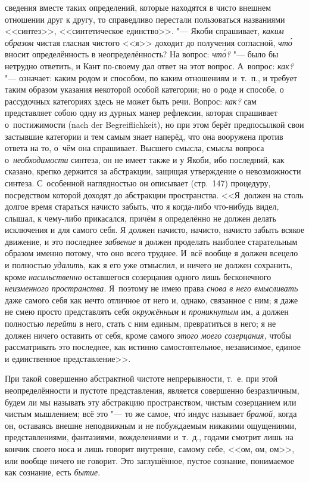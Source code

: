 сведения вместе таких определений, которые находятся в чисто внешнем отношении
друг к другу, то справедливо перестали пользоваться названиями <<синтез>>,
<<синтетическое единство>>. "--- Якоби спрашивает, {\em каким образом}
чистая гласная чистого <<я>> доходит до получения согласной, {\em чт\'{о}}
вносит определённость в неопределённость? На вопрос: {\em чт\'{о}?} "--- было бы
нетрудно ответить, и Кант по-своему дал ответ на этот вопрос. А~вопрос:
{\em как?} "--- означает: каким родом и способом, по каким отношениям и~т.~п.,
и требует таким образом указания некоторой особой категории; но о роде и
способе, о рассудочных категориях здесь не может быть речи. Вопрос: {\em как?}
сам представляет собою одну из дурных манер рефлексии, которая спрашивает
о~постижимости (nach der Begrei\-flich\-keit), но при этом берёт предпосылкой
свои застывшие категории и тем самым знает наперёд, что она вооружена против
ответа на то, о~чём она спрашивает. Высшего смысла, смысла вопроса
о~{\em необходимости} синтеза, он не имеет также и у Якоби, ибо последний, как
сказано, крепко держится за абстракции, защищая утверждение о невозможности
синтеза. С~особенной наглядностью он описывает (стр.~147) процедуру,
посредством которой доходят до абстракции пространства. <<Я~должен на столь
долгое время стараться начисто забыть, что я когда-либо что-нибудь видел,
слышал, к чему-либо прикасался, причём я определённо не должен делать
исключения и для самого себя. Я должен начисто, начисто, начисто забыть всякое
движение, и это последнее {\em забвение} я должен проделать наиболее
старательным образом именно потому, что оно всего труднее. И~всё вообще я
должен всецело и полностью {\em удалить,} как я его уже отмыслил, и ничего не
должен сохранить, кроме {\em насильственно} оставшегося созерцания одного лишь
бесконечного {\em неизменного пространства}. Я~поэтому не имею права
{\em снова в него вмысливать} даже самого себя как нечто отличное от него и,
однако, связанное с ним; я даже не смею просто представлять себя
{\em окружённым} и {\em проникнутым} им, а должен полностью {\em перейти} в
него, стать с ним единым, превратиться в него; я не должен ничего оставить от
себя, кроме самого {\em этого моего созерцания,} чтобы рассматривать это
последнее, как истинно самостоятельное, независимое, единое и единственное
представление>>.

При такой совершенно абстрактной чистоте непрерывности, т.~е. при этой
неопределённости и пустоте представления, является совершенно безразличным,
будем ли мы называть эту абстракцию пространством, чистым созерцанием или
чистым мышлением; всё это "--- то же самое, чт\'{о} индус называет
{\em брамой,} когда он, оставаясь внешне неподвижным и не побуждаемым
никакими ощущениями, представлениями, фантазиями, вожделениями и~т.~д.,
годами смотрит лишь на кончик своего носа и лишь говорит внутренне, самому
себе, <<ом, ом, ом>>, или вообще ничего не говорит. Это заглушённое, пустое
сознание, понимаемое как сознание, есть {\em бытие}.

